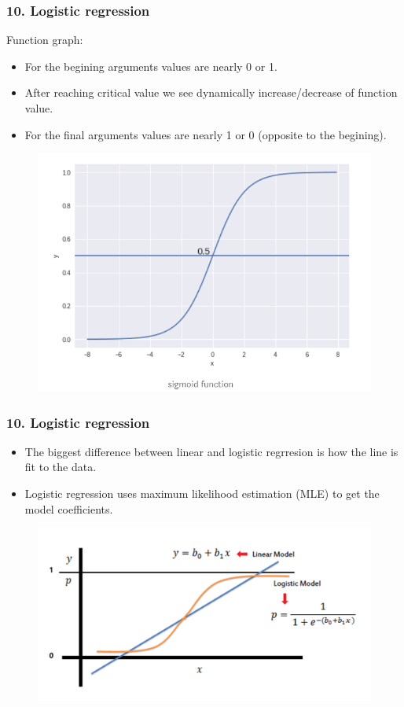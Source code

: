 \documentclass[handout,compress]{beamer} %
\begin{document}
\begin{frame}[allowframebreaks]
\frametitle{10. Logistic regression}
Function graph:
\begin{itemize}
	\item 
	For the begining arguments values are nearly 0 or 1.
	\item
	After reaching critical value we see dynamically increase/decrease of function  value.
	\item
	For the final arguments values are nearly 1 or 0 (opposite to the begining).
\end{itemize}
		\begin{figure}[h]
		\includegraphics[scale=0.3]{images/lukasz1.png}
		\end{figure}

\end{frame}

\begin{frame}[allowframebreaks]
\frametitle{10. Logistic regression}
\begin{itemize}
	\item
	The biggest difference between linear and logistic regrresion is how the line is fit to the data.
	\item 
	Logistic regression uses maximum likelihood estimation (MLE) to get the model coefficients.
	
\end{itemize}
		\begin{figure}[h]
		\includegraphics[scale=0.3]{images/lukasz2.png}
		\end{figure}
\end{frame}
\end{document}
